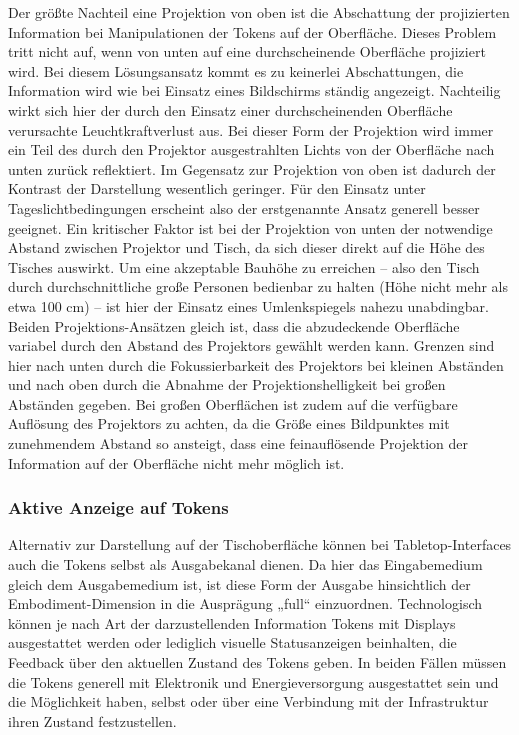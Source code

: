 Der größte Nachteil eine Projektion von oben ist die Abschattung der projizierten Information bei Manipulationen der Tokens auf der Oberfläche. Dieses Problem tritt nicht auf, wenn von unten auf eine durchscheinende Oberfläche projiziert wird. Bei diesem Lösungsansatz kommt es zu keinerlei Abschattungen, die Information wird wie bei Einsatz eines Bildschirms ständig angezeigt. Nachteilig wirkt sich hier der durch den Einsatz einer durchscheinenden Oberfläche verursachte Leuchtkraftverlust aus. Bei dieser Form der Projektion wird immer ein Teil des durch den Projektor ausgestrahlten Lichts von der Oberfläche nach unten zurück reflektiert. Im Gegensatz zur Projektion von oben ist dadurch der Kontrast der Darstellung wesentlich geringer. Für den Einsatz unter Tageslichtbedingungen erscheint also der erstgenannte Ansatz generell besser geeignet. Ein kritischer Faktor ist bei der Projektion von unten der notwendige Abstand zwischen Projektor und Tisch, da sich dieser direkt auf die Höhe des Tisches auswirkt. Um eine akzeptable Bauhöhe zu erreichen -- also den Tisch durch durchschnittliche große Personen bedienbar zu halten (Höhe nicht mehr als etwa 100 cm) -- ist hier der Einsatz eines Umlenkspiegels nahezu unabdingbar. Beiden Projektions-Ansätzen gleich ist, dass die abzudeckende Oberfläche variabel durch den Abstand des Projektors gewählt werden kann. Grenzen sind hier nach unten durch die Fokussierbarkeit des Projektors bei kleinen Abständen und nach oben durch die Abnahme der Projektionshelligkeit bei großen Abständen gegeben. Bei großen Oberflächen ist zudem auf die verfügbare Auflösung des Projektors zu achten, da die Größe eines Bildpunktes mit zunehmendem Abstand so ansteigt, dass eine feinauflösende Projektion der Information auf der Oberfläche nicht mehr möglich ist.


\subsubsection{Aktive Anzeige auf Tokens} %
\label{ssub:aktive_anzeige_auf_tokens}

Alternativ zur Darstellung auf der Tischoberfläche können bei Tabletop-Interfaces auch die Tokens selbst als Ausgabekanal dienen. Da hier das Eingabemedium gleich dem Ausgabemedium ist, ist diese Form der Ausgabe hinsichtlich der Embodiment-Dimension in die Ausprägung „full“ einzuordnen. Technologisch können je nach Art der darzustellenden Information Tokens mit Displays ausgestattet werden oder lediglich visuelle Statusanzeigen beinhalten, die Feedback über den aktuellen Zustand des Tokens geben. In beiden Fällen müssen die Tokens generell mit Elektronik und Energieversorgung ausgestattet sein und die Möglichkeit haben, selbst oder über eine Verbindung mit der Infrastruktur ihren Zustand festzustellen.

